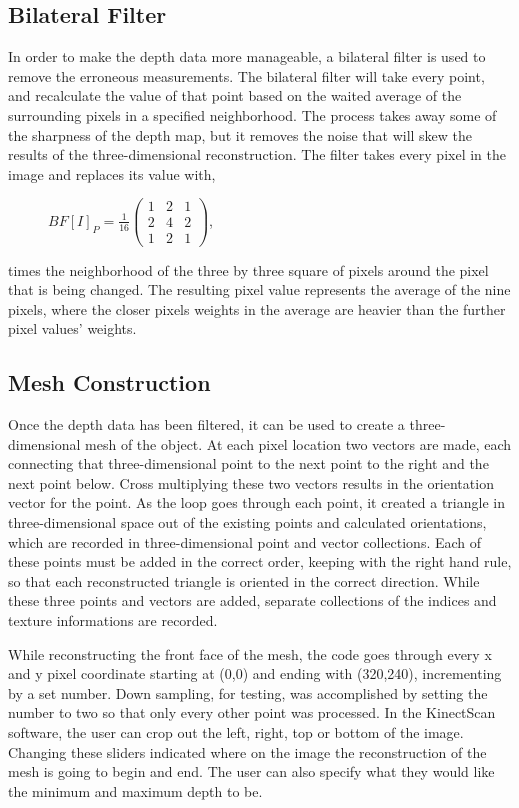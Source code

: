\documentclass[pdftex,10.5pt]{report}
\begin{document}
\subsection{Bilateral Filter}
In order to make the depth data more manageable, a bilateral filter is used to remove the erroneous measurements. The bilateral filter will take every point, and recalculate the value of that point based on the waited average of the surrounding pixels in a specified neighborhood. The process takes away some of the sharpness of the depth map, but it removes the noise that will skew the results of the three-dimensional reconstruction. The filter takes every pixel in the image and replaces its value with,
\begin{figure}[H]
\centering
 $BF[I]_{P} = \frac{1}{16} \left( \begin{array}{ccc}
1 & 2 & 1 \\
2 & 4 & 2 \\
1 & 2 & 1 \end{array}  \right)$,
\end{figure}
times the neighborhood of the three by three square of pixels around the pixel that is being changed. The resulting pixel value represents the average of the nine pixels, where the closer pixels weights in the average are heavier than the further pixel values' weights.  

\subsection{Mesh Construction}
Once the depth data has been filtered, it can be used to create a three-dimensional mesh of the object. At each pixel location two vectors are made, each connecting that three-dimensional point to the next point to the right and the next point below. Cross multiplying these two vectors results in the orientation vector for the point. As the loop goes through each point, it created a triangle in three-dimensional space out of the existing points and calculated orientations, which are recorded in three-dimensional point and vector collections. Each of these points must be added in the correct order, keeping with the right hand rule, so that each reconstructed triangle is oriented in the correct direction. While these three points and vectors are added, separate collections of the indices and texture informations are recorded. 

While reconstructing the front face of the mesh, the code goes through every x and y pixel coordinate starting at (0,0) and ending with (320,240), incrementing by a set number. Down sampling, for testing, was accomplished by setting the number to two so that only every other point was processed. In the KinectScan software, the user can crop out the left, right, top or bottom of the image. Changing these sliders indicated where on the image the reconstruction of the mesh is going to begin and end. The user can also specify what they would like the minimum and maximum depth to be. 
\end{document}
